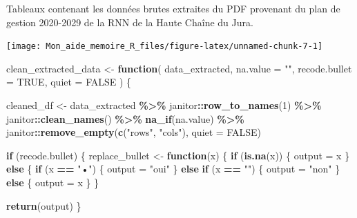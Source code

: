 \documentclass[
  french,
]{book}
\newenvironment{Shaded}{\begin{snugshade}}{\end{snugshade}}
\newcommand{\ControlFlowTok}[1]{\textcolor[rgb]{0.13,0.29,0.53}{\textbf{#1}}}
\newcommand{\DataTypeTok}[1]{\textcolor[rgb]{0.13,0.29,0.53}{#1}}
\newcommand{\DecValTok}[1]{\textcolor[rgb]{0.00,0.00,0.81}{#1}}
\newcommand{\KeywordTok}[1]{\textcolor[rgb]{0.13,0.29,0.53}{\textbf{#1}}}
\newcommand{\NormalTok}[1]{#1}
\newcommand{\OperatorTok}[1]{\textcolor[rgb]{0.81,0.36,0.00}{\textbf{#1}}}
\newcommand{\OtherTok}[1]{\textcolor[rgb]{0.56,0.35,0.01}{#1}}
\newcommand{\StringTok}[1]{\textcolor[rgb]{0.31,0.60,0.02}{#1}}
\begin{document}
\label{tab:juradata} Tableaux contenant les données brutes extraites du PDF provenant du plan de gestion 2020-2029 de la RNN de la Haute Chaîne du Jura.

\begin{center}\texttt{[image: Mon\_aide\_memoire\_R\_files/figure-latex/unnamed-chunk-7-1]} \end{center}

\begin{Shaded}
\begin{Highlighting}[]
\NormalTok{clean\_extracted\_data \textless{}{-}}\StringTok{ }\ControlFlowTok{function}\NormalTok{(}
\NormalTok{  data\_extracted,}
  \DataTypeTok{na.value =} \StringTok{""}\NormalTok{, }
  \DataTypeTok{recode.bullet =} \OtherTok{TRUE}\NormalTok{,}
  \DataTypeTok{quiet =} \OtherTok{FALSE}
\NormalTok{) \{}
  
\NormalTok{  cleaned\_df \textless{}{-}}\StringTok{ }\NormalTok{data\_extracted }\OperatorTok{\%\textgreater{}\%}
\StringTok{    }\NormalTok{janitor}\OperatorTok{::}\KeywordTok{row\_to\_names}\NormalTok{(}\DecValTok{1}\NormalTok{) }\OperatorTok{\%\textgreater{}\%}
\StringTok{    }\NormalTok{janitor}\OperatorTok{::}\KeywordTok{clean\_names}\NormalTok{() }\OperatorTok{\%\textgreater{}\%}
\StringTok{    }\KeywordTok{na\_if}\NormalTok{(na.value) }\OperatorTok{\%\textgreater{}\%}
\StringTok{    }\NormalTok{janitor}\OperatorTok{::}\KeywordTok{remove\_empty}\NormalTok{(}\KeywordTok{c}\NormalTok{(}\StringTok{"rows"}\NormalTok{, }\StringTok{"cols"}\NormalTok{), }\DataTypeTok{quiet =} \OtherTok{FALSE}\NormalTok{)}
  
  \ControlFlowTok{if}\NormalTok{ (recode.bullet) \{}
\NormalTok{    replace\_bullet \textless{}{-}}\StringTok{ }\ControlFlowTok{function}\NormalTok{(x) \{}
      \ControlFlowTok{if}\NormalTok{ (}\KeywordTok{is.na}\NormalTok{(x)) \{}
\NormalTok{        output =}\StringTok{ }\NormalTok{x}
\NormalTok{      \} }\ControlFlowTok{else}\NormalTok{ \{}
        \ControlFlowTok{if}\NormalTok{ (x }\OperatorTok{==}\StringTok{ "•"}\NormalTok{) \{}
\NormalTok{          output =}\StringTok{ "oui"}
\NormalTok{        \} }\ControlFlowTok{else} \ControlFlowTok{if}\NormalTok{ (x }\OperatorTok{==}\StringTok{ ""}\NormalTok{) \{}
\NormalTok{          output =}\StringTok{ "non"}
\NormalTok{        \} }\ControlFlowTok{else}\NormalTok{ \{}
\NormalTok{          output =}\StringTok{ }\NormalTok{x}
\NormalTok{        \}}
\NormalTok{      \}}
      
      \KeywordTok{return}\NormalTok{(output)}
\NormalTok{    \}}
    

\end{Highlighting}
\end{Shaded}
\end{document}
